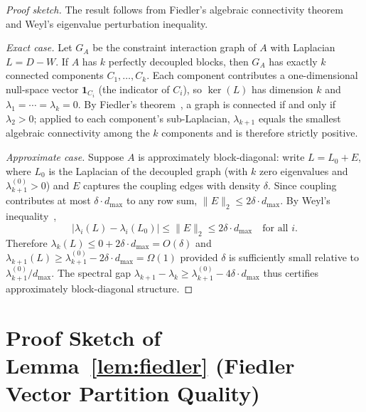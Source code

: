 \documentclass[11pt]{article}
\begin{document}
\begin{proof}[Proof sketch]
The result follows from Fiedler's algebraic connectivity theorem~\cite{fiedler1973} and Weyl's eigenvalue perturbation inequality.

\emph{Exact case.}
Let $G_A$ be the constraint interaction graph of $A$ with Laplacian $L = D - W$.  If $A$ has $k$ perfectly decoupled blocks, then $G_A$ has exactly $k$ connected components $C_1, \ldots, C_k$.  Each component contributes a one-dimensional null-space vector $\mathbf{1}_{C_i}$ (the indicator of $C_i$), so $\ker(L)$ has dimension $k$ and $\lambda_1 = \cdots = \lambda_k = 0$.  By Fiedler's theorem~\cite{fiedler1973}, a graph is connected if and only if $\lambda_2 > 0$; applied to each component's sub-Laplacian, $\lambda_{k+1}$ equals the smallest algebraic connectivity among the $k$ components and is therefore strictly positive.

\emph{Approximate case.}
Suppose $A$ is approximately block-diagonal: write $L = L_0 + E$, where $L_0$ is the Laplacian of the decoupled graph (with $k$ zero eigenvalues and $\lambda_{k+1}^{(0)} > 0$) and $E$ captures the coupling edges with density $\delta$.  Since coupling contributes at most $\delta \cdot d_{\max}$ to any row sum, $\|E\|_2 \leq 2\delta \cdot d_{\max}$.  By Weyl's inequality~\cite{weyl1912},
\[
  |\lambda_i(L) - \lambda_i(L_0)| \leq \|E\|_2 \leq 2\delta \cdot d_{\max}
  \quad \text{for all } i.
\]
Therefore $\lambda_k(L) \leq 0 + 2\delta \cdot d_{\max} = O(\delta)$ and $\lambda_{k+1}(L) \geq \lambda_{k+1}^{(0)} - 2\delta \cdot d_{\max} = \Omega(1)$ provided $\delta$ is sufficiently small relative to $\lambda_{k+1}^{(0)} / d_{\max}$.  The spectral gap $\lambda_{k+1} - \lambda_k \geq \lambda_{k+1}^{(0)} - 4\delta \cdot d_{\max}$ thus certifies approximately block-diagonal structure.
\end{proof}

\section{Proof Sketch of Lemma~\ref{lem:fiedler} (Fiedler Vector Partition Quality)}
\label{app:fiedler-proof}
\end{document}
